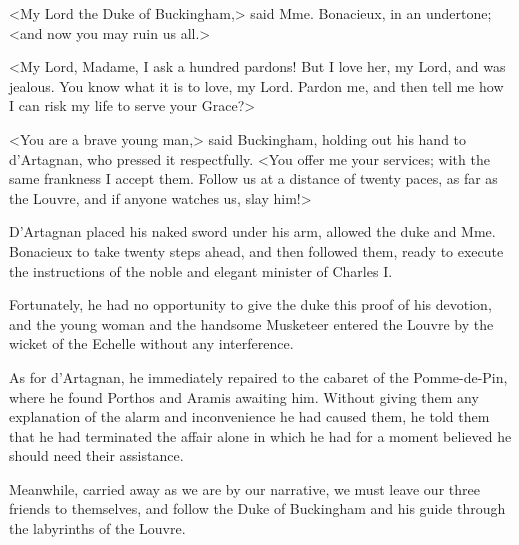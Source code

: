 <My Lord the Duke of Buckingham,> said Mme. Bonacieux, in an undertone; <and now you may ruin us all.> 

<My Lord, Madame, I ask a hundred pardons! But I love her, my Lord, and was jealous. You know what it is to love, my Lord. Pardon me, and then tell me how I can risk my life to serve your Grace?> 

<You are a brave young man,> said Buckingham, holding out his hand to d'Artagnan, who pressed it respectfully. <You offer me your services; with the same frankness I accept them. Follow us at a distance of twenty paces, as far as the Louvre, and if anyone watches us, slay him!> 

D'Artagnan placed his naked sword under his arm, allowed the duke and Mme. Bonacieux to take twenty steps ahead, and then followed them, ready to execute the instructions of the noble and elegant minister of Charles I. 

Fortunately, he had no opportunity to give the duke this proof of his devotion, and the young woman and the handsome Musketeer entered the Louvre by the wicket of the Echelle without any interference. 

As for d'Artagnan, he immediately repaired to the cabaret of the Pomme-de-Pin, where he found Porthos and Aramis awaiting him. Without giving them any explanation of the alarm and inconvenience he had caused them, he told them that he had terminated the affair alone in which he had for a moment believed he should need their assistance. 

Meanwhile, carried away as we are by our narrative, we must leave our three friends to themselves, and follow the Duke of Buckingham and his guide through the labyrinths of the Louvre. 